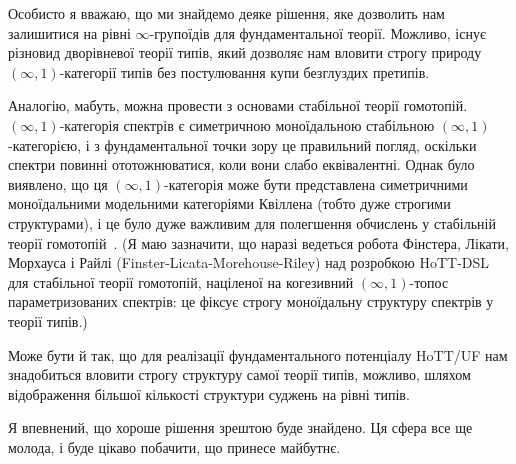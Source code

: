 \documentclass[12pt]{article}
\newcommand*{\inftyone}{\ensuremath{(\infty,1)}}
\begin{document}
Особисто я вважаю, що ми знайдемо деяке рішення, яке дозволить нам залишитися на рівні $\infty$-групоїдів для фундаментальної теорії. Можливо, існує різновид дворівневої теорії типів, який дозволяє нам вловити строгу природу \inftyone-категорії типів без постулювання купи безглуздих претипів.

Аналогію, мабуть, можна провести з основами стабільної теорії гомотопій. \inftyone-категорія спектрів є симетричною моноїдальною стабільною \inftyone-категорією, і з фундаментальної точки зору це правильний погляд, оскільки спектри повинні ототожнюватися, коли вони слабо еквівалентні. Однак було виявлено, що ця \inftyone-категорія може бути представлена симетричними моноїдальними модельними категоріями Квіллена (тобто дуже строгими структурами), і це було дуже важливим для полегшення обчислень у стабільній теорії гомотопій~\cite{EKMM1995,MMSS2001}. (Я маю зазначити, що наразі ведеться робота Фінстера, Лікати, Морхауса і Райлі (Finster-Licata-Morehouse-Riley) над розробкою HoTT-DSL для стабільної теорії гомотопій, націленої на когезивний \inftyone-топос параметризованих спектрів: це фіксує строгу моноїдальну структуру спектрів у теорії типів.)

Може бути й так, що для реалізації фундаментального потенціалу HoTT/UF нам знадобиться вловити строгу структуру самої теорії типів, можливо, шляхом відображення більшої кількості структури суджень на рівні типів.

Я впевнений, що хороше рішення зрештою буде знайдено. Ця сфера все ще молода, і буде цікаво побачити, що принесе майбутнє.
\end{document}
